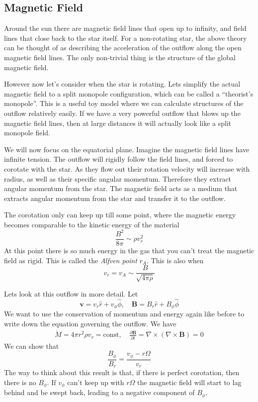 \documentclass[letterpaper, 11pt]{article}
\numberwithin{equation}{section}
\numberwithin{figure}{section}
\begin{document}
\subsection{Magnetic Field}

Around the sun there are magnetic field lines that open up to infinity, and
field lines that close back to the star itself. For a non-rotating star, the
above theory can be thought of as describing the acceleration of the outflow
along the open magnetic field lines. The only non-trivial thing is the structure
of the global magnetic field.

However now let's consider when the star is rotating. Lets simplify the actual
magnetic field to a split monopole configuration, which can be called a
``theorist's monopole''. This is a useful toy model where we can calculate
structures of the outflow relatively easily. If we have a very powerful outflow
that blows up the magnetic field lines, then at large distances it will actually
look like a split monopole field.

We will now focus on the equatorial plane. Imagine the magnetic field lines have
infinite tension. The outflow will rigidly follow the field lines, and forced to
corotate with the star. As they flow out their rotation velocity will increase
with radius, as well as their specific angular momentum. Therefore they extract
angular momentum from the star. The magnetic field acts as a medium that
extracts angular momentum from the star and transfer it to the outflow.

The corotation only can keep up till some point, where the magnetic energy
becomes comparable to the kinetic energy of the material
\begin{equation}
  \label{eq:5}
  \frac{B^2}{8\pi} \sim \rho v_r^2
\end{equation}
At this point there is so much energy in the gas that you can't treat the
magnetic field as rigid. This is called the \emph{Alfven point} $r_A$. This is also
when
\begin{equation}
  \label{eq:6}
  v_r = v_A \sim \frac{B}{\sqrt{4\pi\rho}}
\end{equation}

Lets look at this outflow in more detail. Let
\begin{equation}
  \label{eq:7}
  \mathbf{v} = v_r\hat{r} + v_{\phi}\hat{\phi},\quad \mathbf{B} = B_r\hat{r} + B_{\phi}\hat{\phi}
\end{equation}
We want to use the conservation of momentum and energy again like before to
write down the equation governing the outflow. We have
\begin{align}
  \dot{M} = 4\pi r^2 \rho v_r = \text{const}, \quad \frac{\partial \mathbf{B}}{\partial t} = \nabla\times(\nabla \times \mathbf{B}) = 0
\end{align}
We can show that
\begin{equation}
  \label{eq:8}
  \frac{B_{\phi}}{B_{r}} = \frac{v_{\phi} - r\Omega}{v_r}
\end{equation}
The way to think about this result is that, if there is perfect corotation, then
there is no $B_{\phi}$. If $v_{\phi}$ can't keep up with $r\Omega$ the magnetic
field will start to lag behind and be swept back, leading to a negative
component of $B_{\phi}$.
\end{document}
